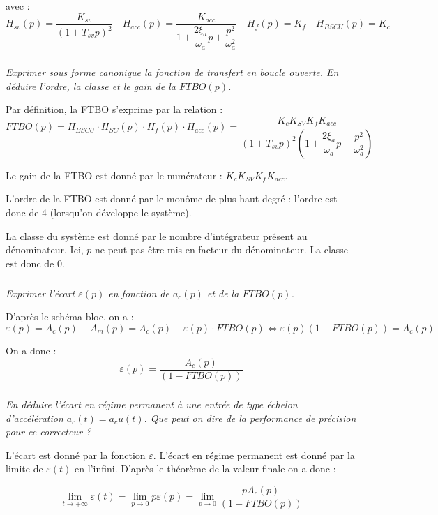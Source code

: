 \documentclass[10pt,fleqn]{article} %
\begin{document}
\begin{multicols}{2}
avec : 
$$
H_{sv} (p)=\dfrac{K_{sv}}{\left(1+T_{sv} p\right)^2}
 \quad 
H_{acc}(p)=\dfrac{K_{acc}}{1+\dfrac{2\xi_a }{\omega_a}p+\dfrac{p^2}{\omega_a^2}}
 \quad 
H_f(p)=K_f
\quad
H_{BSCU}(p)=K_c
$$
\fi

\subparagraph{}
\textit{Exprimer sous forme canonique la fonction de transfert en boucle ouverte. En déduire
l’ordre, la classe et le gain de la $FTBO(p)$.}
\ifprof
\begin{corrige}
Par définition, la FTBO s'exprime par la relation :
$$
FTBO(p)=H_{BSCU} \cdot H_{SC}(p) \cdot H_f(p) \cdot H_{acc}(p) =
\dfrac{K_cK_{SV}K_fK_{acc}}{\left( 1+T_{sv}p
\right)^2\left(1+\dfrac{2\xi_a}{\omega_a}p+\dfrac{p^2}{\omega_a^2}\right)}
$$

Le gain de la FTBO est donné par le numérateur : $K_cK_{SV}K_fK_{acc}$. 

L'ordre de la FTBO est donné par le monôme de plus haut degré : l'ordre est
donc de 4 (lorsqu'on développe le système).

La classe du système est donné par le nombre d'intégrateur présent au
dénominateur. Ici, $p$ ne peut pas être mis en facteur du dénominateur. La
classe est donc de 0.


\end{corrige}
\else
\fi

\subparagraph{}
\textit{Exprimer l'écart $\varepsilon(p)$ en fonction de $a_c(p)$ et de la $FTBO(p)$.}
\ifprof
\begin{corrige}
D'après le schéma bloc, on a : 
$$
\varepsilon(p) = A_c(p)-A_m(p) =A_c(p)-\varepsilon(p)\cdot FTBO(p)
\Leftrightarrow
\varepsilon(p) \left( 1-FTBO(p)\right) = A_c(p)
$$

On a donc :
$$
\varepsilon(p)  = \dfrac{A_c(p)}{\left( 1-FTBO(p)\right)}
$$

\end{corrige}
\else
\fi

\subparagraph{}
\textit{En déduire l'écart en régime permanent à une entrée de type échelon d'accélération
$a_c (t)=a_cu (t)$. Que peut on dire de la performance de précision pour ce correcteur ?}
\ifprof
\begin{corrige}
L'écart est donné par la fonction $\varepsilon$. L'écart en régime permanent
est donné par la limite de $\varepsilon(t)$ en l'infini. D'après le théorème de
la valeur finale on a donc :

$$
\lim\limits_{t\to +\infty} \varepsilon(t) = \lim\limits_{p\to 0}
p\varepsilon(p) =  \lim\limits_{p\to 0} \dfrac{p A_c(p)}{\left(
1-FTBO(p)\right)}
$$



\end{corrige}
\end{multicols}
\end{document}
